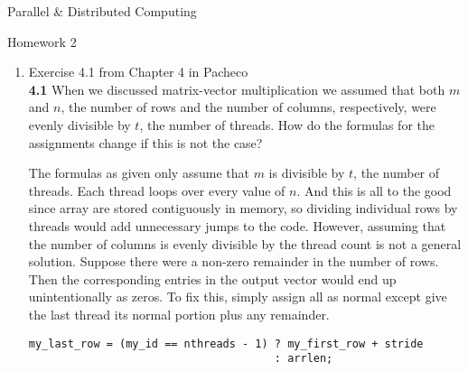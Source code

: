 \documentclass[11pt,epsfig,letterpaper]{article}
\begin{document}

    \vspace{5pc}
    \centerline{\huge Parallel \& Distributed Computing}
    \vspace{0.5pc}
    \centerline{\huge Homework 2}
    \vspace{3pc}


    \begin{enumerate}

            \item Exercise 4.1 from Chapter 4 in Pacheco \\
            {\bf 4.1} \>\> When we discussed matrix-vector multiplication we assumed that both $m$ and $n$, the number of rows and the number of columns, respectively, were evenly divisible by $t$, the number of threads. How do the formulas for the assignments change if this is not the case?
            \vspace{0.5pc}

            \quad The formulas as given only assume that $m$ is divisible by $t$, the number of threads. Each thread loops over every value of $n$. And this is all to the good since array are stored contiguously in memory, so dividing individual rows by threads would add unnecessary jumps to the code.
            \quad However, assuming that the number of columns is evenly divisible by the thread count is not a general solution. Suppose there were a non-zero remainder in the number of rows. Then the corresponding entries in the output vector would end up unintentionally as zeros.
            \quad To fix this, simply assign all as normal except give the last thread its normal portion plus any remainder.
            \begin{verbatim}
my_last_row = (my_id == nthreads - 1) ? my_first_row + stride
                                      : arrlen;
            \end{verbatim}



\end{enumerate}
\end{document}
